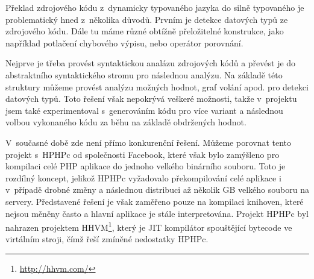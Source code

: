 \documentclass[czech]{ExcelAtFIT}
\begin{document}
		Překlad zdrojového kódu z~dynamicky typovaného jazyka do silně typovaného je problematický hned z~několika důvodů. Prvním je detekce datových typů ze zdrojového kódu. Dále tu máme různé obtížně přeložitelné konstrukce, jako například potlačení chybového výpisu, nebo operátor porovnání.


		Nejprve je třeba provést syntaktickou analázu zdrojových kódů a převést je do abstraktního syntaktického stromu pro následnou analýzu. Na základě této struktury můžeme provést analýzu možných hodnot, graf volání apod. pro detekci datových typů. Toto řešení však nepokrývá veškeré možnosti, takže v~projektu jsem také experimentoval s~generováním kódu pro více variant a následnou volbou vykonaného kódu za běhu na základě obdržených hodnot.







		V~současné době zde není přímo konkurenční ře\-še\-ní. Můžeme porovnat tento projekt s~HPHPc od společnosti Facebook, které však bylo zamýšleno pro kompilaci celé PHP aplikace do jednoho velkého bi\-nár\-ní\-ho sou\-bo\-ru. Toto je rozdílný koncept, jelikož HPHPc vy\-ža\-do\-va\-lo překompilování celé aplikace i v~případě drobné změny a následnou distribuci až několik GB velkého souboru na servery. Představené řešení je však zaměřeno pouze na kompilaci knihoven, které nejsou měněny často a hlavní aplikace je stále interpretována. Projekt HPHPc byl nahrazen projektem HHVM\footnote{\url{http://hhvm.com/}}, který je JIT kompilátor spouštějící bytecode ve virtálním stroji, čímž řeší zmíněné nedostatky HPHPc\cite{hphpcHipHop}.
\end{document}
